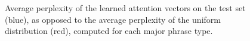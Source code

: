 \documentclass[11pt]{article}
\newcommand{\nascomment}[1]{\textcolor{blue}{{\textbf{[#1 --\textsc{nas}]}}}}
\renewcommand{\nascomment}[1]{}
\begin{document}
\begin{figure}[!h]
\centering
{}
\caption{Average perplexity of the learned attention vectors on the test set (blue), as opposed to the average perplexity of the uniform distribution (red), computed for each major phrase type. \nascomment{perplexity, or entropy?} }
\label{fig:entropy}
\end{figure}
\end{document}
